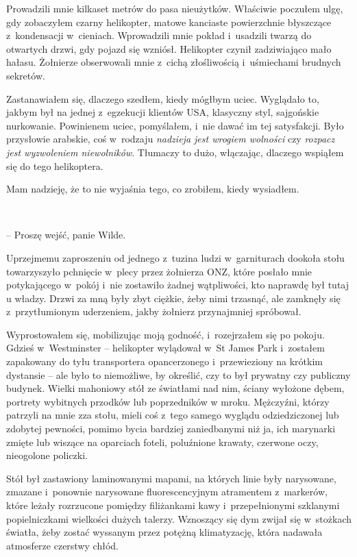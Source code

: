 \documentclass[oneside,polish,11pt,sfheadings]{mwbk}
\begin{document}
Prowadzili mnie kilkaset metrów do pasa nieużytków. Właściwie poczułem
ulgę, gdy zobaczyłem czarny helikopter, matowe kanciaste powierzchnie
błyszczące z~kondensacji w~cieniach. Wprowadzili mnie pokład i~usadzili
twarzą do otwartych drzwi, gdy pojazd się wzniósł. Helikopter czynił
zadziwiająco mało hałasu. Żołnierze obserwowali mnie z~cichą
złośliwością i~uśmiechami brudnych sekretów.

Zastanawiałem się, dlaczego szedłem, kiedy mógłbym uciec. Wyglądało to,
jakbym był na jednej z~egzekucji klientów USA, klasyczny styl,
sajgońskie nurkowanie. Powinienem uciec, pomyślałem, i~nie dawać im tej
satysfakcji. Było przysłowie arabskie, coś w~rodzaju \emph{nadzieja jest
wrogiem wolności} czy \emph{rozpacz jest wyzwoleniem niewolników}.
Tłumaczy to dużo, włączając, dlaczego wspiąłem się do tego helikoptera.

Mam nadzieję, że to nie wyjaśnia tego, co zrobiłem, kiedy wysiadłem.

~

-- Proszę wejść, panie Wilde.

Uprzejmemu zaproszeniu od jednego z~tuzina ludzi w~garniturach dookoła
stołu towarzyszyło pchnięcie w~plecy przez żołnierza ONZ, które posłało
mnie potykającego w~pokój i~nie zostawiło żadnej wątpliwości, kto
naprawdę był tutaj u władzy. Drzwi za mną były zbyt ciężkie, żeby nimi
trzasnąć, ale zamknęły się z~przytłumionym uderzeniem, jakby żołnierz
przynajmniej spróbował.

Wyprostowałem się, mobilizując moją godność, i~rozejrzałem się po
pokoju. Gdzieś w~Westminster -- helikopter wylądował w~St James Park i~zostałem zapakowany do tyłu transportera opancerzonego i~przewieziony na
krótkim dystansie -- ale było to niemożliwe, by określić, czy to był
prywatny czy publiczny budynek. Wielki mahoniowy stół ze światłami nad
nim, ściany wyłożone dębem, portrety wybitnych przodków lub poprzedników
w mroku. Mężczyźni, którzy patrzyli na mnie zza stołu, mieli coś z~tego
samego wyglądu odziedziczonej lub zdobytej pewności, pomimo bycia
bardziej zaniedbanymi niż ja, ich marynarki zmięte lub wiszące na
oparciach foteli, poluźnione krawaty, czerwone oczy, nieogolone
policzki.

Stół był zastawiony laminowanymi mapami, na których linie były
narysowane, zmazane i~ponownie narysowane fluorescencyjnym atramentem z~markerów, które leżały rozrzucone pomiędzy filiżankami kawy i~przepełnionymi szklanymi popielniczkami wielkości dużych talerzy.
Wznoszący się dym zwijał się w~stożkach światła, żeby zostać wyssanym
przez potężną klimatyzację, która nadawała atmosferze czerstwy chłód.
\end{document}
